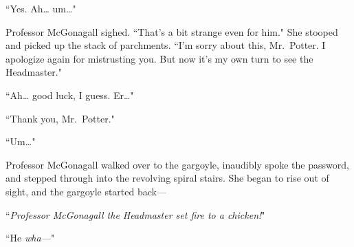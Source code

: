 ``Yes. Ah{\ldots} um{\ldots}"

Professor McGonagall sighed. ``That's a bit strange even for him." She stooped and picked up the stack of parchments. ``I'm sorry about this, Mr.~Potter. I apologize again for mistrusting you. But now it's my own turn to see the Headmaster."

``Ah{\ldots} good luck, I guess. Er{\ldots}"

``Thank you, Mr.~Potter."

``Um{\ldots}"

Professor McGonagall walked over to the gargoyle, inaudibly spoke the password, and stepped through into the revolving spiral stairs. She began to rise out of sight, and the gargoyle started back—

``\emph{Professor McGonagall the Headmaster set fire to a chicken!}"

``He \emph{wha—}"


